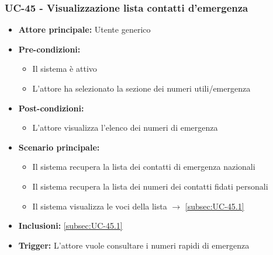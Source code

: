 \documentclass[a4paper,12pt]{article}
\begin{document}
\subsubsection{UC-45 - Visualizzazione lista contatti d'emergenza} \label{sec:UC-45}
\begin{itemize}
    \item \textbf{Attore principale:} Utente generico
    \item \textbf{Pre-condizioni:}
    \begin{itemize}
        \item Il sistema è attivo
        \item L'attore ha selezionato la sezione dei numeri utili/emergenza
    \end{itemize}
    \item \textbf{Post-condizioni:}
    \begin{itemize}
        \item L'attore visualizza l'elenco dei numeri di emergenza
    \end{itemize}
    \item \textbf{Scenario principale:} 
    \begin{itemize}
        \item Il sistema recupera la lista dei contatti di emergenza nazionali
        \item Il sistema recupera la lista dei numeri dei contatti fidati personali 
        \item Il sistema visualizza le voci della lista $\rightarrow$ \ref{subsec:UC-45.1}
    \end{itemize}
    \item \textbf{Inclusioni:} \ref{subsec:UC-45.1}
    \item \textbf{Trigger:} L'attore vuole consultare i numeri rapidi di emergenza
\end{itemize}
\end{document}
